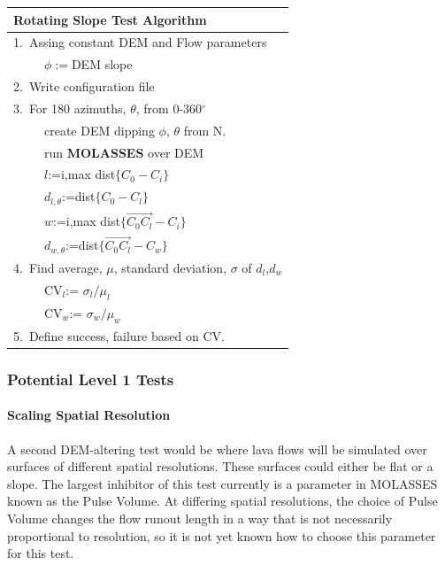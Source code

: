 \documentclass[12pt,letter]{article}
\newcommand{\tabitem}{~~\llap{\textbullet}~~}
\newcommand{\tabitem}{~~\llap{\textbullet}~~}
\begin{document}
			\begin{center}
				\begin{tabular}{l}
					\toprule
					\textbf{Rotating Slope Test Algorithm}\\
					\midrule
					1.~Assing constant DEM and Flow parameters\\
						~\tabitem $\phi:=$DEM slope\\
					2.~Write configuration file\\
					3.~For 180 azimuths, $\theta$, from 0-360$^{\circ}$\\
						~\tabitem create DEM dipping $\phi$, $\theta$ from N.\\
						~\tabitem run \textbf{MOLASSES} over DEM\\
						~\tabitem $l$:=i,max dist$\{C_0-C_i\}$\\
						~\tabitem $d_{l,\theta}$:=dist$\{C_0-C_l\}$\\
						~\tabitem $w$:=i,max dist$\{\overrightarrow{C_0C_l}-C_i\}$\\
						~\tabitem $d_{w,\theta}$:=dist$\{\overrightarrow{C_0C_l}-C_w\}$\\
					4.~Find average, $\mu$, standard deviation, $\sigma$ of $d_l$,$d_w$\\
						~\tabitem CV$_l$:= $\sigma_l/\mu_l$\\
						~\tabitem CV$_w$:= $\sigma_w/\mu_w$\\
					5.~Define success, failure based on CV.\\
					\bottomrule
				\end{tabular}
			\end{center}


		\subsubsection{Potential Level 1 Tests}
		\paragraph{Scaling Spatial Resolution}
			A second DEM-altering test would be where lava flows will be simulated over surfaces of different spatial resolutions. These surfaces could either be flat or a slope. The largest inhibitor of this test currently is a parameter in MOLASSES known as the Pulse Volume. At differing spatial resolutions, the choice of Pulse Volume changes the flow runout length in a way that is not necessarily proportional to resolution, so it is not yet known how to choose this parameter for this test.
\end{document}
